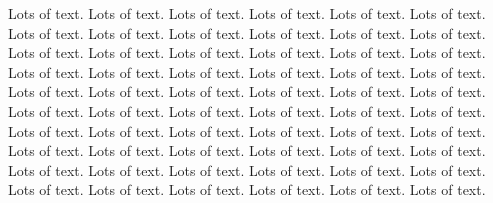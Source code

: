 \documentclass[letterpaper,10pt,oneside]{article}
\begin{document}


Lots of text. Lots of text. Lots of text. Lots of text. Lots of text. Lots of text. Lots of text. Lots of text. Lots of text. Lots of text. Lots of text. Lots of text. Lots of text. Lots of text. Lots of text. Lots of text. Lots of text. Lots of text. Lots of text. Lots of text. Lots of text. Lots of text. Lots of text. Lots of text. Lots of text. Lots of text. Lots of text. Lots of text. Lots of text. Lots of text. Lots of text. Lots of text. Lots of text. Lots of text. Lots of text. Lots of text. Lots of text. Lots of text. Lots of text. Lots of text. Lots of text. Lots of text. Lots of text. Lots of text. Lots of text. Lots of text. Lots of text. Lots of text. Lots of text. Lots of text. Lots of text. Lots of text. Lots of text. Lots of text. Lots of text. Lots of text. Lots of text. Lots of text. Lots of text. Lots of text. 
\end{document}
